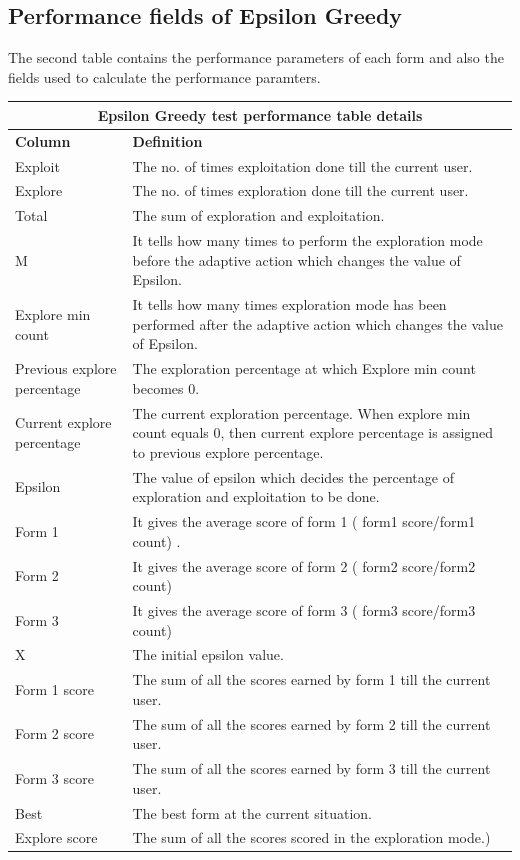 \documentclass[12pt]{report}
\begin{document}
\subsection { Performance fields of Epsilon Greedy}
The second table contains the performance parameters of each form and also the fields used to calculate the performance paramters.
\newline
\begin{tabular}{ |p{3cm}|p{12cm}|  }
\hline
\multicolumn{2}{|c|}{\textbf {Epsilon Greedy test performance table details}} \\
\hline
\textbf { Column} & \textbf {Definition}  \\
\hline
Exploit  & The no. of times exploitation done till the current user.  \\
\hline
Explore & The no. of times exploration done till the current user.  \\
\hline
Total & The sum of exploration and exploitation.   \\
\hline
M & It tells how many times to perform the exploration mode before the adaptive action which changes the value of Epsilon.  \\
\hline
Explore min count  &  It tells how many times exploration mode has been performed after the adaptive action which changes the value of Epsilon. \\
\hline
Previous explore percentage & The exploration percentage at which Explore min count becomes 0.  \\
\hline
Current explore percentage &The current exploration percentage. When explore min count equals 0, then current explore percentage is assigned to previous explore percentage. \\
\hline
Epsilon & The value of epsilon which decides the percentage of exploration and exploitation to be done.  \\
\hline
Form 1 &It gives the average score of form 1 ( form1 score/form1 count)	.  \\
\hline
Form 2 &It gives the average score of form 2 ( form2 score/form2 count)	   \\
\hline
Form 3 & It gives the average score of form 3 ( form3 score/form3 count)  \\
\hline
X & The initial epsilon value.  \\
\hline
Form 1 score & The sum of all the scores earned by form 1 till the current user.  \\
\hline
Form 2 score & The sum of all the scores earned by form 2 till the current user.  \\
\hline
Form 3 score &The sum of all the scores earned by form 3 till the current user.\\
\hline
Best & The best form at the current situation.  \\
\hline
Explore score & The sum of all the scores scored in the exploration mode.)  \\
\hline

\end{tabular}
\end{document}
